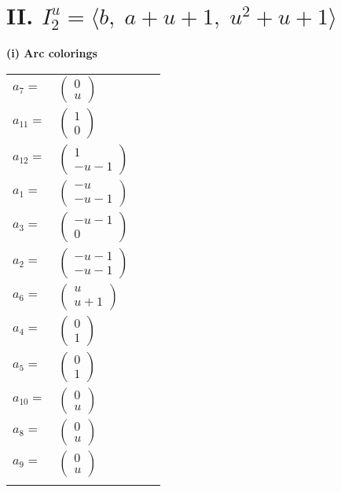 \documentclass[1p]{elsarticle_modified}
\theoremstyle{definition}
\begin{document}
\centering \section*{II. $I^u_{2}= \langle b,\;a+u+1,\;u^2+u+1 \rangle$}
\flushleft \textbf{(i) Arc colorings}\\
\begin{tabular}{m{7pt} m{180pt} m{7pt} m{180pt} }
\flushright $a_{7}=$&$\begin{pmatrix}0\\u\end{pmatrix}$ \\
\flushright $a_{11}=$&$\begin{pmatrix}1\\0\end{pmatrix}$ \\
\flushright $a_{12}=$&$\begin{pmatrix}1\\- u-1\end{pmatrix}$ \\
\flushright $a_{1}=$&$\begin{pmatrix}- u\\- u-1\end{pmatrix}$ \\
\flushright $a_{3}=$&$\begin{pmatrix}- u-1\\0\end{pmatrix}$ \\
\flushright $a_{2}=$&$\begin{pmatrix}- u-1\\- u-1\end{pmatrix}$ \\
\flushright $a_{6}=$&$\begin{pmatrix}u\\u+1\end{pmatrix}$ \\
\flushright $a_{4}=$&$\begin{pmatrix}0\\1\end{pmatrix}$ \\
\flushright $a_{5}=$&$\begin{pmatrix}0\\1\end{pmatrix}$ \\
\flushright $a_{10}=$&$\begin{pmatrix}0\\u\end{pmatrix}$ \\
\flushright $a_{8}=$&$\begin{pmatrix}0\\u\end{pmatrix}$ \\
\flushright $a_{9}=$&$\begin{pmatrix}0\\u\end{pmatrix}$\\&\end{tabular}
\end{document}
